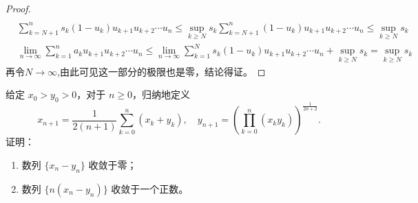 \documentclass[../../main.tex]{subfiles}%
\begin{document}
\begin{proof}
\begin{align*}
\end{align*}
\begin{align*}
&\sum_{k = N + 1}^{n}s_k(1 - u_k)u_{k + 1}u_{k + 2}\cdots u_n\leqslant \sup_{k\geqslant  N}s_k\sum_{k = N + 1}^{n}(1 - u_k)u_{k + 1}u_{k + 2}\cdots u_n\leqslant \sup_{k\geqslant  N}s_k\\
&\lim_{n\rightarrow\infty}\sum_{k = 1}^{n}a_ku_{k + 1}u_{k + 2}\cdots u_n\leqslant \lim_{n\rightarrow\infty}\sum_{k = 1}^{N}s_k(1 - u_k)u_{k + 1}u_{k + 2}\cdots u_n+\sup_{k\geqslant  N}s_k=\sup_{k\geqslant  N}s_k
\end{align*}
再令$N\to \infty$,由此可见这一部分的极限也是零，结论得证。

\end{proof}

\begin{example}
给定 $x_0 > y_0 > 0$，对于 $n \geqslant 0$，归纳地定义
\[
x_{n+1} = \frac{1}{2(n+1)}\sum_{k=0}^{n}(x_k + y_k),\quad y_{n+1} = \left( \prod_{k=0}^{n}(x_k y_k) \right)^{\frac{1}{2n+2}}.
\]
证明：
\begin{enumerate}[(1)]
\item 数列 $\{x_n - y_n\}$ 收敛于零；

\item 数列 $\{n(x_n - y_n)\}$ 收敛于一个正数。
\end{enumerate}
\end{example}
\end{document}
